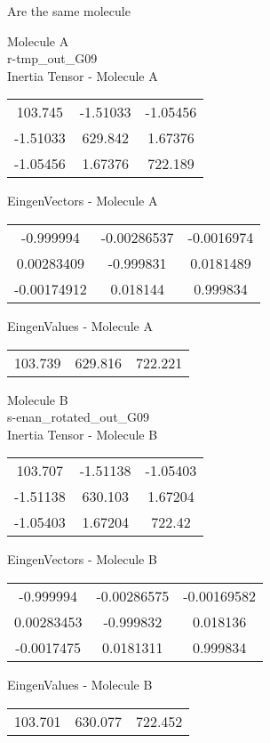 \begin{center}
\vtab
\vtab
\textcolor{NavyBlue}{\Large Are the same molecule}
\end{center}
\newpage
\begin{multicols}{2}
\begin{center}
Molecule A \\ 
r-tmp\_out\_G09
\\
Inertia Tensor - Molecule A \\
\vtab
\begin{tabular}{|c c c|}
103.745	 & 	-1.51033	 & 	-1.05456	 \\
-1.51033	 & 	629.842	 & 	1.67376	 \\
-1.05456	 & 	1.67376	 & 	722.189
\end{tabular}

\vtab
 EingenVectors - Molecule A     \\
\vtab
\begin{tabular}{|c c c|}
-0.999994	 & 	-0.00286537	 & 	-0.0016974	 \\
0.00283409	 & 	-0.999831	 & 	0.0181489	 \\
-0.00174912	 & 	0.018144	 & 	0.999834
\end{tabular}

\vtab
 EingenValues - Molecule A     \\
\vtab
\begin{tabular}{|c c c|}
103.739	 & 	629.816	 & 	722.221
\end{tabular}
\columnbreak

Molecule B \\ 
s-enan\_rotated\_out\_G09
\\
Inertia Tensor - Molecule B \\
\vtab
\begin{tabular}{|c c c|}
103.707	 & 	-1.51138	 & 	-1.05403	 \\
-1.51138	 & 	630.103	 & 	1.67204	 \\
-1.05403	 & 	1.67204	 & 	722.42
\end{tabular}

\vtab
 EingenVectors - Molecule B     \\
\vtab
\begin{tabular}{|c c c|}
-0.999994	 & 	-0.00286575	 & 	-0.00169582	 \\
0.00283453	 & 	-0.999832	 & 	0.018136	 \\
-0.0017475	 & 	0.0181311	 & 	0.999834
\end{tabular}

\vtab
 EingenValues - Molecule B     \\
\vtab
\begin{tabular}{|c c c|}
103.701	 & 	630.077	 & 	722.452
\end{tabular}

\end{center}
\end{multicols}
